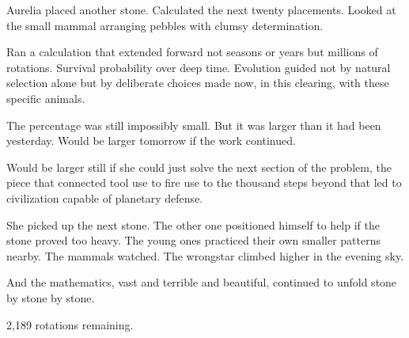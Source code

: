 Aurelia placed another stone. Calculated the next twenty placements. Looked at the small mammal arranging pebbles with clumsy determination.

Ran a calculation that extended forward not seasons or years but millions of rotations. Survival probability over deep time. Evolution guided not by natural selection alone but by deliberate choices made now, in this clearing, with these specific animals.

The percentage was still impossibly small. But it was larger than it had been yesterday. Would be larger tomorrow if the work continued.

Would be larger still if she could just solve the next section of the problem, the piece that connected tool use to fire use to the thousand steps beyond that led to civilization capable of planetary defense.

She picked up the next stone. The other one positioned himself to help if the stone proved too heavy. The young ones practiced their own smaller patterns nearby. The mammals watched. The wrongstar climbed higher in the evening sky.

And the mathematics, vast and terrible and beautiful, continued to unfold stone by stone by stone.

2,189 rotations remaining.

